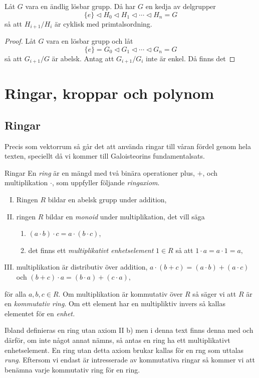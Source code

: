 \documentclass{article}
\theoremstyle{definition}
\begin{document}
\begin{myprop}{}{}
  Låt $G$ vara en ändlig lösbar grupp. Då har $G$ en kedja av delgrupper 
  \[\{e\} \triangleleft H_0 \triangleleft H_1 \triangleleft \cdots \triangleleft H_n = G\]
  så att $H_{i+1}/H_i$ är cyklisk med primtalsordning.  
\end{myprop}

\begin{proof}
  Låt $G$ vara en lösbar grupp och låt 
  \[ \{e\} = G_0 \triangleleft G_1 \triangleleft \cdots \triangleleft G_n = G \]
  så att $G_{i+1}/G$ är abelsk. Antag att $G_{i+1}/G_i$ inte är enkel. Då finns det
\end{proof}

\section{Ringar, kroppar och polynom}
\subsection{Ringar}
Precis som vektorrum så går det att använda ringar till våran fördel genom hela texten, speciellt då vi kommer till
Galoisteorins fundamentalsats.
\begin{mydef}{Ringar}{}
  En \textit{ring} är en mängd med två binära operationer plus, $+$, och multiplikation $\cdot$, som uppfyller följande \textit{ringaxiom}.
  \begin{enumerate}[I)]
    \item Ringen $R$ bildar en abelsk grupp under addition,
    \item ringen $R$ bildar en \textit{monoid} under multiplikation, det vill säga 
    \begin{enumerate}
      \item $(a \cdot b) \cdot c = a \cdot (b \cdot c)$,
      \item det finns ett \textit{multiplikativt enhetselement} $1 \in R$ så att $1 \cdot a = a \cdot 1 = a,$
    \end{enumerate}
    \item multiplikation är distributiv över addition, $a \cdot (b+c) = (a \cdot b) + (a \cdot c)$ och $(b + c) \cdot a = (b \cdot a) + (c \cdot a),$
  \end{enumerate}
  för alla $a, b, c \in R$. Om multiplikation är kommutativ över $R$ så säger vi att $R$ är en \textit{kommutativ ring}. 
  Om ett element har en multipliktiv invers så kallas elementet för en \textit{enhet.}
\end{mydef}
Ibland definieras en ring utan axiom II b) men i denna text finns denna med och därför, om inte något annat nämns, så antas en ring ha ett multiplikativt enhetselement. 
En ring utan detta axiom brukar kallas för en rng som uttalas \textit{rung}. Eftersom vi endast är intresserade av kommutativa ringar så kommer vi 
att benämna varje kommutativ ring för en ring. 
\end{document}
